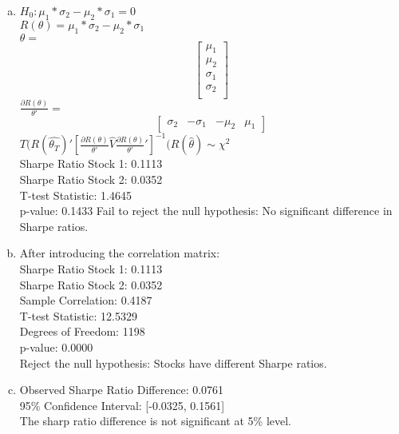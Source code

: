 \begin{enumerate}[(a)]

\item 
$H_0: \mu_1*\sigma_2 - \mu_2*\sigma_1 = 0 $\\
$R (\theta) = \mu_1*\sigma_2 - \mu_2*\sigma_1$\\
$\theta = $
\[
\begin{bmatrix}
  \mu_1 \\
  \mu_2 \\
  \sigma_1\\
  \sigma_2 \\
\end{bmatrix}
\]
$\frac{\partial R(\theta)}{\theta '}=$
\[
\begin{bmatrix}
  \sigma_2 & -\sigma_1 & -\mu_2 & \mu_1
\end{bmatrix}
\]
$T(R(\hat{\theta_T})'[\frac{\partial R(\theta)}{\theta '}\hat{V}\frac{\partial R(\theta)}{\theta '}']^{-1}(R(\hat{\theta}) \sim \chi^2$\\
Sharpe Ratio Stock 1: 0.1113\\
Sharpe Ratio Stock 2: 0.0352\\
T-test Statistic: 1.4645\\
p-value: 0.1433
Fail to reject the null hypothesis: No significant difference in Sharpe ratios.
\item 
After  introducing the correlation matrix: \\
Sharpe Ratio Stock 1: 0.1113\\
Sharpe Ratio Stock 2: 0.0352\\
Sample Correlation: 0.4187\\
T-test Statistic: 12.5329\\
Degrees of Freedom: 1198\\
p-value: 0.0000\\
Reject the null hypothesis: Stocks have different Sharpe ratios.
\item 
Observed Sharpe Ratio Difference: 0.0761\\
95\% Confidence Interval: [-0.0325, 0.1561]\\
The sharp ratio difference is not significant at 5\% level.

\end{enumerate}


